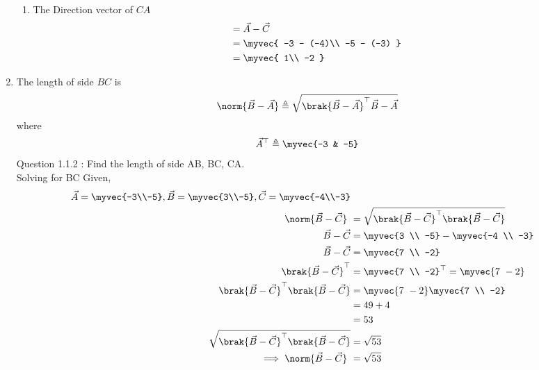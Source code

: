 \documentclass[11pt]{book}
\begin{document}
\begin{enumerate}[label=\thesection.\arabic*.,ref=\thesection.\theenumi]
\begin{enumerate}
  \item  The Direction vector of $CA$  \begin{align} &= \vec{A} - \vec{C} \\ 
 &= \myvec{ -3 - (-4)\\ -5 - (-3) } \\&= \myvec{ 1\\ -2 }
  \end{align}
 \end{enumerate}

\item The length of side $BC$ is 
		\begin{align}
			\norm{\vec{B}-\vec{A}} \triangleq \sqrt{\brak{\vec{B}-\vec{A}}^{\top}{\vec{B}-\vec{A}}}
		\end{align}
		where
		\begin{align}
			\vec{A}^{\top}\triangleq\myvec{-3 & -5}
		\end{align}
Question 1.1.2 : Find the length of side AB, BC, CA.\\
\solution
Solving for BC
Given, 
\begin{align}
\vec{A} = \myvec{-3\\-5},
\vec{B} = \myvec{3\\-5},
\vec{C} = \myvec{-4\\-3} \\  
 \norm{\vec{B}-\vec{C}}\ &=  \sqrt{\brak{\vec{B}-\vec{C}}^{\top}\brak{\vec{B}-\vec{C}}} \\
 \vec{B}-\vec{C} &= \myvec{3 \\ -5} - \myvec{-4 \\ -3} \\
 \vec{B}-\vec{C} &= \myvec{7 \\ -2} \\
 \brak{\vec{B}-\vec{C}}^{\top} &= {\myvec{7 \\ -2}}^{\top} = \myvec{7 \ -2} \\
\brak{\vec{B}-\vec{C}}^{\top}\brak{\vec{B}-\vec{C}} &= \myvec{7 \ -2} \myvec{7 \\ -2}\\
             &= 49+4 \\
             &= 53 \\  
 \sqrt{\brak{\vec{B}-\vec{C}}^{\top}\brak{\vec{B}-\vec{C}}} &= \sqrt{53}	\\
	\implies \norm{\vec{B}-\vec{C}}\ &= \sqrt{53} 
\end{align}


\end{enumerate}
\end{document}
